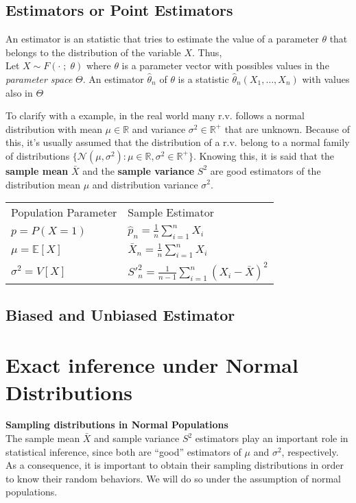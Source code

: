 \subsection{Estimators or Point Estimators}
An estimator is an statistic that tries to estimate the value of a parameter
$\theta$ that belongs to the distribution of the variable $X$. Thus,\\

Let $X \sim F(\cdot\;;\;\theta)$ where $\theta$ is a parameter vector with
possibles values in the \textit{parameter space} $\Theta$. An estimator
$\hat{\theta}_n$ of $\theta$ is a statistic $\hat{\theta}_n(X_1,\dots,X_n)$ with
values also in $\Theta$ 

To clarify with a example, in the real world many r.v. follows a normal
distribution with mean $\mu \in \mathbb{R}$ and variance $\sigma^2 \in
\mathbb{R}^+$ that are unknown. Because of this, it's usually assumed that the
distribution of a r.v. belong to a normal family of distributions
$\{\mathcal{N}(\mu,\sigma^2):\mu\in\mathbb{R},\sigma^2\in \mathbb{R^+} \}$.
Knowing this, it is said that the \textbf{sample mean} $\bar{X}$ and the
\textbf{sample variance} $S^2$ are good estimators of the distribution mean
$\mu$ and distribution variance $\sigma^2$.

\begin{table}[H]
    \centering
    \begin{tabular}{ll}
    Population Parameter    & Sample Estimator                          \\
    $p = P(X=1)$            & $\hat{p}_n = \frac{1}{n}\sum_{i=1}^n X_i$ \\
    $\mu = \mathbb{E}[X]$   & $\bar{X}_n = \frac{1}{n}\sum_{i=1}^n X_i$ \\
    $\sigma^2 = V[X]$       & $S'^2_n = \frac{1}{n-1}\sum_{i=1}^{n}
    (X_i-\bar{X})^2 $
    \end{tabular}
\end{table}

\subsection{Biased and Unbiased Estimator}

\section{Exact inference under Normal Distributions}
\textbf{Sampling distributions in Normal Populations}\\
The sample mean $\bar{X}$ and sample variance $S^2$ estimators play an important
role in statistical inference, since both are “good” estimators of $\mu$ and
$\sigma^2$, respectively. As a consequence, it is important to obtain their
sampling distributions in order to know their random behaviors. We will do so
under the assumption of normal populations.

